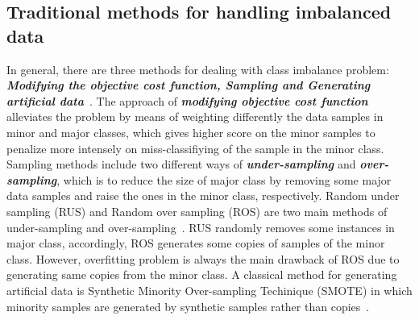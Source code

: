 \documentclass[conference]{IEEEtran}
\begin{document}
\subsection{Traditional methods for handling imbalanced data}\label{subsec_imbalance}
In general, there are three methods for dealing with class imbalance problem: \emph{\textbf{Modifying the objective cost function, Sampling and Generating artificial data}}~\cite{Vu2016}. The approach of \emph{\textbf{modifying objective cost function}} alleviates the problem by means of weighting differently the data samples in minor and major classes, which gives higher score on the minor samples to penalize more intensely on miss-classifiying of the sample in the minor class. Sampling methods include two different ways of \emph{\textbf{under-sampling}} and \emph{\textbf{over-sampling}}, which is to reduce the size of major class by removing some major data samples and raise the ones in the minor class, respectively. Random under sampling (RUS) and Random over sampling (ROS) are two main methods of under-sampling and over-sampling~\cite{ROS2000}. RUS randomly removes some instances in major class, accordingly, ROS generates some copies of samples of the minor class. However, overfitting problem is always the main drawback of ROS due to generating same copies from the minor class. A classical method for generating artificial data is Synthetic Minority Over-sampling Techinique (SMOTE) in which minority samples are generated by synthetic samples rather than copies~\cite{SMOTE2002}.
\end{document}
